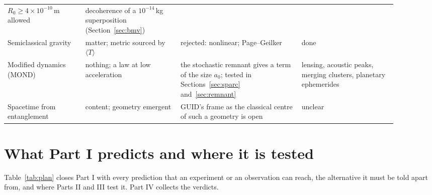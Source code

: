 \begin{center}
\begin{longtable}{@{}P{0.18\linewidth}P{0.22\linewidth}P{0.28\linewidth}P{0.22\linewidth}@{}}
$R_0\ge4\times10^{-10}$\,m allowed~\cite{donadi,figurato} & decoherence of a $10^{-14}$\,kg superposition (Section~\ref{sec:bmv}) \\
Semiclassical gravity~\cite{moller,rosenfeld63} & matter; metric sourced by $\langle T\rangle$ & rejected: nonlinear; Page--Geilker &
done~\cite{pagegeilker} \\
Modified dynamics (MOND)~\cite{milgrom} & nothing; a law at low acceleration & the stochastic remnant gives a term of the size $a_0$; tested in Sections~\ref{sec:sparc} and~\ref{sec:remnant} & lensing,
acoustic peaks, merging clusters, planetary ephemerides \\
Spacetime from entanglement~\cite{vanraamsdonk,ermepr} & content; geometry emergent & GUID's frame as the classical centre of such a geometry is
open & unclear \\
\bottomrule
\end{longtable}
\end{center}


\section{What Part I predicts and where it is tested}\label{sec:plan}

Table~\ref{tab:plan} closes Part I with every prediction that an experiment or an observation can reach, the alternative it must be told
apart from, and where Parts II and III test it. Part IV collects the verdicts.

